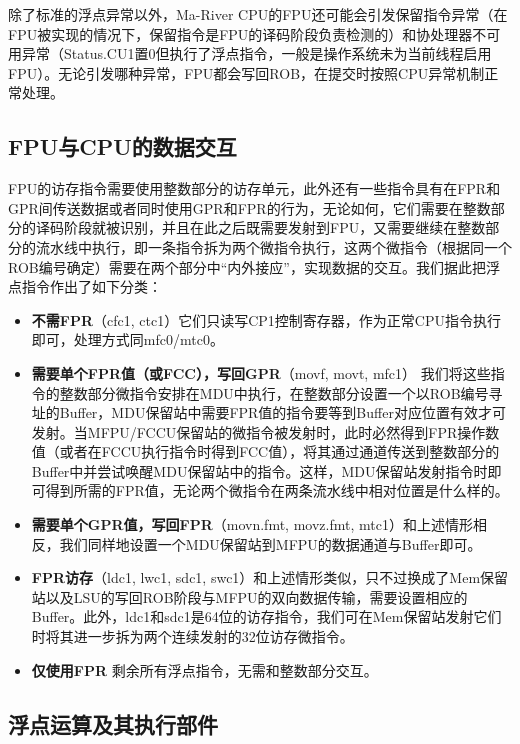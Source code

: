 除了标准的浮点异常以外，Ma-River CPU的FPU还可能会引发保留指令异常（在FPU被实现的情况下，保留指令是FPU的译码阶段负责检测的）和协处理器不可用异常（Status.CU1置0但执行了浮点指令，一般是操作系统未为当前线程启用FPU）。无论引发哪种异常，FPU都会写回ROB，在提交时按照CPU异常机制正常处理。

\subsection{FPU与CPU的数据交互}

FPU的访存指令需要使用整数部分的访存单元，此外还有一些指令具有在FPR和GPR间传送数据或者同时使用GPR和FPR的行为，无论如何，它们需要在整数部分的译码阶段就被识别，并且在此之后既需要发射到FPU，又需要继续在整数部分的流水线中执行，即一条指令拆为两个微指令执行，这两个微指令（根据同一个ROB编号确定）需要在两个部分中“内外接应”，实现数据的交互。我们据此把浮点指令作出了如下分类：

\begin{itemize}
    \item \textbf{不需FPR}（cfc1, ctc1）\quad 它们只读写CP1控制寄存器，作为正常CPU指令执行即可，处理方式同mfc0/mtc0。
    \item \textbf{需要单个FPR值（或FCC），写回GPR}（movf, movt, mfc1） \quad 我们将这些指令的整数部分微指令安排在MDU中执行，在整数部分设置一个以ROB编号寻址的Buffer，MDU保留站中需要FPR值的指令要等到Buffer对应位置有效才可发射。当MFPU/FCCU保留站的微指令被发射时，此时必然得到FPR操作数值（或者在FCCU执行指令时得到FCC值），将其通过通道传送到整数部分的Buffer中并尝试唤醒MDU保留站中的指令。这样，MDU保留站发射指令时即可得到所需的FPR值，无论两个微指令在两条流水线中相对位置是什么样的。
    \item \textbf{需要单个GPR值，写回FPR}（movn.fmt, movz.fmt, mtc1）\quad 和上述情形相反，我们同样地设置一个MDU保留站到MFPU的数据通道与Buffer即可。
    \item \textbf{FPR访存}（ldc1, lwc1, sdc1, swc1）\quad 和上述情形类似，只不过换成了Mem保留站以及LSU的写回ROB阶段与MFPU的双向数据传输，需要设置相应的Buffer。此外，ldc1和sdc1是64位的访存指令，我们可在Mem保留站发射它们时将其进一步拆为两个连续发射的32位访存微指令。
    \item \textbf{仅使用FPR} \quad 剩余所有浮点指令，无需和整数部分交互。
\end{itemize}

\subsection{浮点运算及其执行部件}

